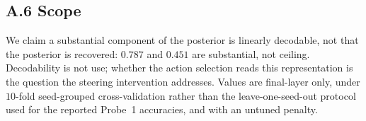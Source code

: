 \subsection{A.6 Scope}

We claim a substantial component of the posterior is linearly decodable, not
that the posterior is recovered: $0.787$ and $0.451$ are substantial, not
ceiling. Decodability is not use; whether the action selection reads this
representation is the question the steering intervention addresses. Values are
final-layer only, under $10$-fold seed-grouped cross-validation rather than the
leave-one-seed-out protocol used for the reported Probe~1 accuracies, and with
an untuned penalty.
